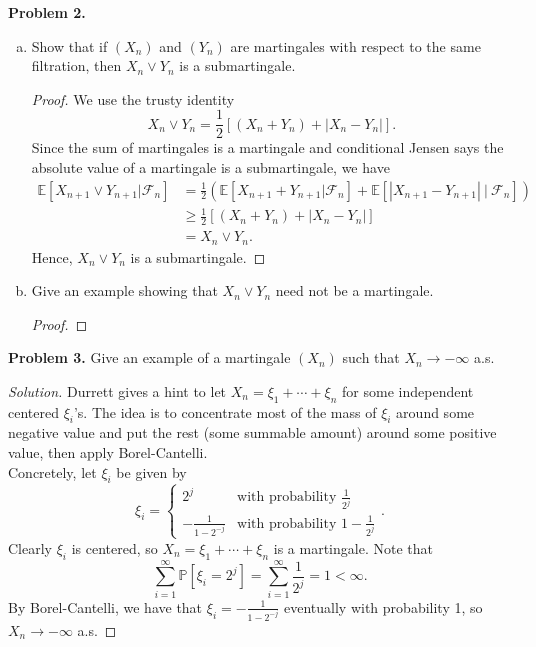 \documentclass[11pt,letterpaper]{report}
\newcommand{\mcal}[1]{\mathcal{#1}}
\newcommand{\E}{\mathbb{E}}
\newcommand{\Prob}{\mathbb{P}}
\newenvironment{solution}
{\begin{proof}[Solution]}
{\end{proof}}
\begin{document}
\noindent\textbf{Problem 2. }
\begin{enumerate}[(a)]
	\item Show that if $(X_n)$ and $(Y_n)$ are martingales with respect to the same filtration, then $X_n\lor Y_n$ is a submartingale.
	\begin{proof}
		We use the trusty identity
		\[
		X_n\lor Y_n = \frac{1}{2}[(X_n+Y_n) + |X_n - Y_n|].
		\]
		Since the sum of martingales is a martingale and conditional Jensen says the absolute value of a martingale is a submartingale, we have
		\begin{align*}
			\E[X_{n+1}\lor Y_{n+1}|\mcal{F}_n] &= \frac{1}{2}(\E[X_{n+1}+Y_{n+1}|\mcal{F}_n] + \E[|X_{n+1} -Y_{n+1}|\ |\ \mcal{F}_n])\\
			&\geq \frac{1}{2}[(X_n + Y_n) + |X_n - Y_n|]\\
			&= X_n\lor Y_n.
		\end{align*}
		Hence, $X_n\lor Y_n$ is a submartingale.
	\end{proof}

	\item Give an example showing that $X_n \lor Y_n$ need not be a martingale.
	\begin{proof}
		
	\end{proof}
\end{enumerate}

\noindent\textbf{Problem 3. }
Give an example of a martingale $(X_n)$ such that $X_n\to -\infty$ a.s.
\begin{solution}
	Durrett gives a hint to let $X_n = \xi_1 + \cdots + \xi_n$ for some independent centered $\xi_i$'s. The idea is to concentrate most of the mass of $\xi_i$ around some negative value and put the rest (some summable amount) around some positive value, then apply Borel-Cantelli.\\

	\noindent Concretely, let $\xi_i$ be given by
	\[
	\xi_i = \begin{cases}
		2^j&\text{with probability }\frac{1}{2^j}\\
		-\frac{1}{1-2^{-j}}&\text{with probability }1-\frac{1}{2^j}
	\end{cases}.
	\]
	Clearly $\xi_i$ is centered, so $X_n = \xi_1 + \cdots + \xi_n$ is a martingale. Note that
	\[
	\sum_{i=1}^\infty \Prob[\xi_i = 2^j] = \sum_{i=1}^\infty \frac{1}{2^j} = 1<\infty.
	\]
	By Borel-Cantelli, we have that $\xi_i = -\frac{1}{1-2^{-j}}$ eventually with probability 1, so $X_n\to -\infty$ a.s.
\end{solution}
\end{document}
